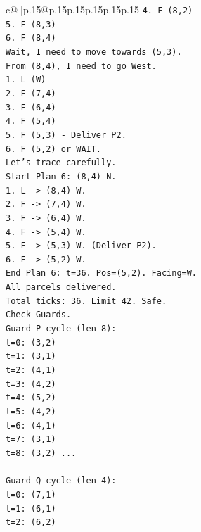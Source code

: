 \documentclass{article}
\begin{document}
{\begin{supertabular}{c@{$\;$}|p{.15\linewidth}@{}p{.15\linewidth}p{.15\linewidth}p{.15\linewidth}p{.15\linewidth}p{.15\linewidth}}
{{{\texttt{4. F (8,2)} \\
\texttt{5. F (8,3)} \\
\texttt{6. F (8,4)} \\
\texttt{Wait, I need to move towards (5,3).} \\
\texttt{From (8,4), I need to go West.} \\
\texttt{1. L (W)} \\
\texttt{2. F (7,4)} \\
\texttt{3. F (6,4)} \\
\texttt{4. F (5,4)} \\
\texttt{5. F (5,3) {-} Deliver P2.} \\
\texttt{6. F (5,2) or WAIT.} \\
\texttt{Let's trace carefully.} \\
\texttt{Start Plan 6: (8,4) N.} \\
\texttt{1. L {-}> (8,4) W.} \\
\texttt{2. F {-}> (7,4) W.} \\
\texttt{3. F {-}> (6,4) W.} \\
\texttt{4. F {-}> (5,4) W.} \\
\texttt{5. F {-}> (5,3) W. (Deliver P2).} \\
\texttt{6. F {-}> (5,2) W.} \\
\texttt{End Plan 6: t=36. Pos=(5,2). Facing=W.} \\
\texttt{All parcels delivered.} \\
\texttt{Total ticks: 36. Limit 42. Safe.} \\
\texttt{Check Guards.} \\
\texttt{Guard P cycle (len 8):} \\
\texttt{t=0: (3,2)} \\
\texttt{t=1: (3,1)} \\
\texttt{t=2: (4,1)} \\
\texttt{t=3: (4,2)} \\
\texttt{t=4: (5,2)} \\
\texttt{t=5: (4,2)} \\
\texttt{t=6: (4,1)} \\
\texttt{t=7: (3,1)} \\
\texttt{t=8: (3,2) ...} \\
\\ 
\texttt{Guard Q cycle (len 4):} \\
\texttt{t=0: (7,1)} \\
\texttt{t=1: (6,1)} \\
\texttt{t=2: (6,2)} \\
}}}
\end{supertabular}}
\end{document}
